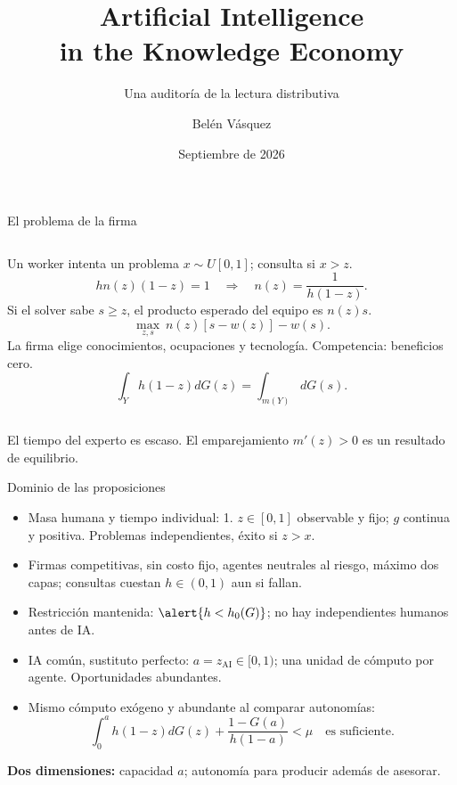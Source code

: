 \documentclass[aspectratio=169,11pt]{beamer}
\title[Ide \& Talamàs: capacidad y autonomía]{Artificial Intelligence\\in the Knowledge Economy}
\subtitle{Una auditoría de la lectura distributiva}
\author{Belén Vásquez}
\institute{Modelamiento Económico con IA}
\date{Septiembre de 2026}
\newcommand{\aAI}{z_{\mathrm{AI}}}
\begin{document}
\begin{frame}[plain]
\titlepage
\vspace{-1cm}
\begin{center}\small\href{\RepoURL}{\texttt{\RepoURL}}\end{center}
\end{frame}

\begin{frame}{El problema de la firma}
\begin{columns}[T,onlytextwidth]
Un worker intenta un problema $x\sim U[0,1]$; consulta si $x>z$.
\[
 hn(z)(1-z)=1\quad\Rightarrow\quad n(z)=\frac1{h(1-z)}.
\]
Si el solver sabe $s\ge z$, el producto esperado del equipo es $n(z)s$.
\[
\max_{z,s}\ n(z)[s-w(z)]-w(s).
\]
La firma elige conocimientos, ocupaciones y tecnología. Competencia: beneficios cero.
\[
\int_Yh(1-z)dG(z)=\int_{m(Y)}dG(s).
\]
\end{columns}
\medskip
\begin{keybox}El tiempo del experto es escaso. El emparejamiento $m'(z)>0$ es un resultado de equilibrio.\end{keybox}
\end{frame}

\begin{frame}{Dominio de las proposiciones}
\small
\begin{itemize}
\item Masa humana y tiempo individual: 1. $z\in[0,1]$ observable y fijo; $g$ continua y positiva. Problemas independientes, éxito si $z>x$.
\item Firmas competitivas, sin costo fijo, agentes neutrales al riesgo, máximo dos capas; consultas cuestan $h\in(0,1)$ aun si fallan.
\item Restricción mantenida: $\alert{h<h_0(G)}$; no hay independientes humanos antes de IA.
\item IA común, sustituto perfecto: $a=\aAI\in[0,1)$; una unidad de cómputo por agente. Oportunidades abundantes.
\item Mismo cómputo exógeno y abundante al comparar autonomías:
\[
\int_0^a h(1-z)dG(z)+\frac{1-G(a)}{h(1-a)}<\mu
\quad\text{es suficiente.}
\]
\end{itemize}
\textbf{Dos dimensiones:} capacidad $a$; autonomía para producir además de asesorar.
\end{frame}
\end{document}
